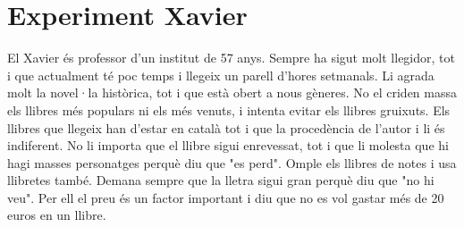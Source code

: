 
\section{Experiment Xavier}

El Xavier és professor d'un institut de 57 anys. Sempre ha sigut molt llegidor, tot i que actualment té poc temps i llegeix un parell d'hores setmanals. Li agrada molt la novel·la històrica, tot i que està obert a nous gèneres. No el criden massa els llibres més populars ni els més venuts, i intenta evitar els llibres gruixuts. Els llibres que llegeix han d'estar en català tot i que la procedència de l'autor i li és indiferent. No li importa que el llibre sigui enrevessat, tot i que li molesta que hi hagi masses personatges perquè diu que "es perd". Omple els llibres de notes i usa llibretes també. Demana sempre que la lletra sigui gran perquè diu que "no hi veu". Per ell el preu és un factor important i diu que no es vol gastar més de 20 euros en un llibre.


